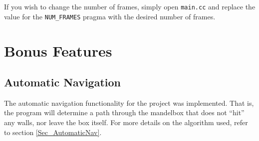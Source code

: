 \documentclass[11pt]{article}
\begin{document}
If you wish to change the number of frames, simply open \texttt{main.cc} and replace the value for the \texttt{NUM\_FRAMES} pragma with the desired number of frames.

\section{Bonus Features}
\subsection{Automatic Navigation}
The automatic navigation functionality for the project was implemented. That is, the program will determine a path through the mandelbox that does not ``hit'' any walls, nor leave the box itself. For more details on the algorithm used, refer to section \ref{Sec_AutomaticNav}.
\end{document}
